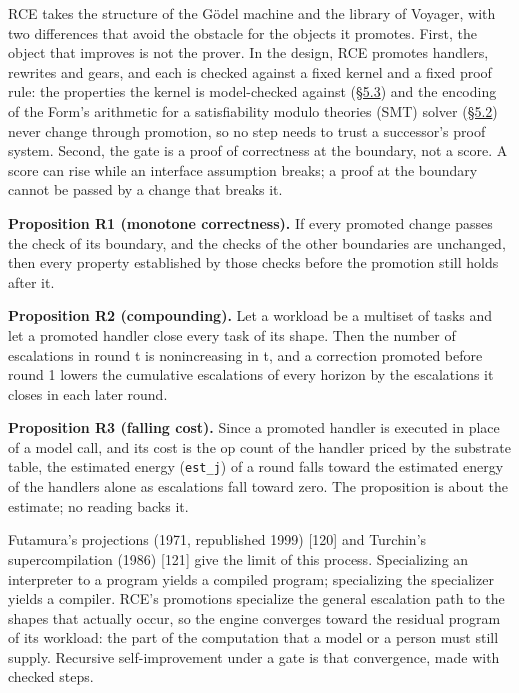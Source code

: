 \documentclass[10pt,letterpaper]{article}
\begin{document}
RCE takes the structure of the Gödel machine and the library of Voyager,
with two differences that avoid the obstacle for the objects it
promotes. First, the object that improves is not the prover. In the
design, RCE promotes handlers, rewrites and gears, and each is checked
against a fixed kernel and a fixed proof rule: the properties the kernel
is model-checked against
(\href{https://research.openie.dev/papers/rce/\#53-model-checking-of-the-kernel}{§5.3})
and the encoding of the Form's arithmetic for a satisfiability modulo
theories (SMT) solver
(\href{https://research.openie.dev/papers/rce/\#52-the-proof-rule-for-rewrites}{§5.2})
never change through promotion, so no step needs to trust a successor's
proof system. Second, the gate is a proof of correctness at the
boundary, not a score. A score can rise while an interface assumption
breaks; a proof at the boundary cannot be passed by a change that breaks
it.

\textbf{Proposition R1 (monotone correctness).} If every promoted change
passes the check of its boundary, and the checks of the other boundaries
are unchanged, then every property established by those checks before
the promotion still holds after it.

\textbf{Proposition R2 (compounding).} Let a workload be a multiset of
tasks and let a promoted handler close every task of its shape. Then the
number of escalations in round t is nonincreasing in t, and a correction
promoted before round 1 lowers the cumulative escalations of every
horizon by the escalations it closes in each later round.

\textbf{Proposition R3 (falling cost).} Since a promoted handler is
executed in place of a model call, and its cost is the op count of the
handler priced by the substrate table, the estimated energy
(\texttt{est\_j}) of a round falls toward the estimated energy of the
handlers alone as escalations fall toward zero. The proposition is about
the estimate; no reading backs it.

Futamura's projections (1971, republished 1999) {[}120{]} and Turchin's
supercompilation (1986) {[}121{]} give the limit of this process.
Specializing an interpreter to a program yields a compiled program;
specializing the specializer yields a compiler. RCE's promotions
specialize the general escalation path to the shapes that actually
occur, so the engine converges toward the residual program of its
workload: the part of the computation that a model or a person must
still supply. Recursive self-improvement under a gate is that
convergence, made with checked steps.
\end{document}
